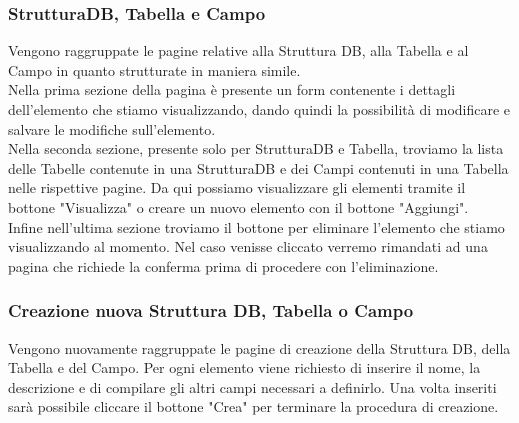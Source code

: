 \documentclass[5pt]{article}
\begin{document}
	    \subsubsection{StrutturaDB, Tabella e Campo}
	    Vengono raggruppate le pagine relative alla Struttura DB, alla Tabella e al Campo in quanto strutturate in maniera simile.\\
	    Nella prima sezione della pagina è presente un form contenente i dettagli dell'elemento che stiamo visualizzando, dando quindi la possibilità di modificare e salvare le modifiche sull'elemento.\\
	    Nella seconda sezione, presente solo per StrutturaDB e Tabella, troviamo la lista delle Tabelle contenute in una StrutturaDB e dei Campi contenuti in una Tabella nelle rispettive pagine. Da qui possiamo visualizzare gli elementi tramite il bottone "Visualizza" o creare un nuovo elemento con il bottone "Aggiungi".\\
	    Infine nell'ultima sezione troviamo il bottone per eliminare l'elemento che stiamo visualizzando al momento. Nel caso venisse cliccato verremo rimandati ad una pagina che richiede la conferma prima di procedere con l'eliminazione.
	    
	    \subsubsection{Creazione nuova Struttura DB, Tabella o Campo}
	    Vengono nuovamente raggruppate le pagine di creazione della Struttura DB, della Tabella e del Campo. Per ogni elemento viene richiesto di inserire il nome, la descrizione e di compilare gli altri campi necessari a definirlo. Una volta inseriti sarà possibile cliccare il bottone "Crea" per terminare la procedura di creazione.
	    
\end{document}
